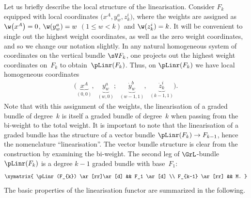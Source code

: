 Let us brief\/ly describe the local structure of the linearisation. Consider $F_{k}$ equipped with local coordinates $\big(x^{A}, y_{w}^{a}, z^{i}_{k}\big)$, where the weights are assigned as $\w\big(x^A\big)=0$, $\w(y^a_{w}) = w$ $(1\leq w < k)$ and $\w(z^i_k) =k$. It will be convenient to single out the highest weight coordinates, as well as the zero weight coordinates, and so we change our notation slightly. In any natural homogeneous system of coordinates on the vertical bundle $\sV F_{k}$, one projects out the highest weight coordinates on~$F_{k}$ to obtain~$\pLinr(F_{k})$. Thus, on $\pLinr(F_{k})$ we have local homogeneous coordinates
\begin{gather*}
\Big(\underbrace{x^{A}}_{(0,0)}, \hspace{5pt} \underbrace{y^{a}_{w}}_{(w,0)}; \hspace{5pt} \underbrace{\dot{y}^{b}_{w}}_{(w-1,1)}, \hspace{5pt} \underbrace{\dot{z}_{k}^{i}}_{(k-1,1)}\Big).
 \end{gather*}
Note that with this assignment of the weights, the linearisation of a graded bundle of degree~$k$ is itself a graded bundle of degree~$k$ when passing from the bi-weight to the total weight. It is important to note that the linearisation of a graded bundle has the structure of a vector bundle $\pLinr(F_{k}) \rightarrow F_{k-1}$, hence the nomenclature ``linearisation''. The vector bundle structure is clear from the construction by examining the bi-weight. The second leg of $\GrL$-bundle $\pLinr(F_{k})$ is a degree $k-1$ graded bundle with base~$F_1$:
\begin{gather*}
\xymatrix{
\pLinr(F_{k}) \ar[rr]\ar[d] && F_1 \ar[d] \\
F_{k-1} \ar[rr] && M.
}
\end{gather*}
The basic properties of the linearisation functor are summarized in the following.
